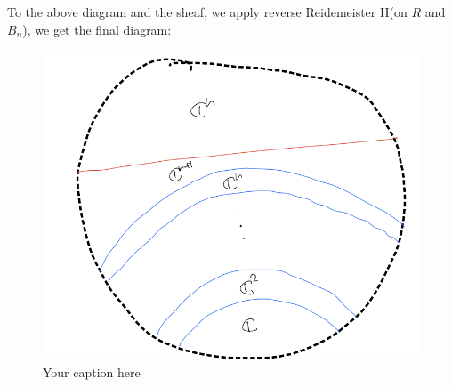 To the above diagram and the sheaf, we apply reverse Reidemeister \RN{2}(on $R$ and $B_n$), we get the final diagram:

\begin{figure}[H] %
    \centering
    \includegraphics[width=\linewidth]{diagrams/theorem13/4.png} %
    \caption{Your caption here}
    \label{fig:your-label}
\end{figure}